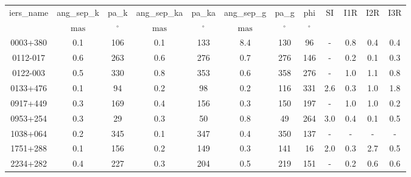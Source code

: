 \begin{table}
\begin{tabular}{cccccccccccc}
iers_name & ang_sep_k & pa_k & ang_sep_ka & pa_ka & ang_sep_g & pa_g & phi & SI & I1R & I2R & I3R \\
 & $\mathrm{mas}$ & $\mathrm{{}^{\circ}}$ & $\mathrm{mas}$ & $\mathrm{{}^{\circ}}$ & $\mathrm{mas}$ & $\mathrm{{}^{\circ}}$ & $\mathrm{{}^{\circ}}$ &  &  &  &  \\
0003+380 & 0.1 & 106 & 0.1 & 133 & 8.4 & 130 & 96 & - & 0.8 & 0.4 & 0.4 \\
0112-017 & 0.6 & 263 & 0.6 & 276 & 0.7 & 276 & 146 & - & 0.2 & 0.1 & 0.3 \\
0122-003 & 0.5 & 330 & 0.8 & 353 & 0.6 & 358 & 276 & - & 1.0 & 1.1 & 0.8 \\
0133+476 & 0.1 & 94 & 0.2 & 98 & 0.2 & 116 & 331 & 2.6 & 0.3 & 1.0 & 1.8 \\
0917+449 & 0.3 & 169 & 0.4 & 156 & 0.3 & 150 & 197 & - & 1.0 & 1.0 & 0.2 \\
0953+254 & 0.3 & 29 & 0.3 & 50 & 0.8 & 49 & 264 & 3.0 & 0.4 & 0.1 & 0.5 \\
1038+064 & 0.2 & 345 & 0.1 & 347 & 0.4 & 350 & 137 & - & - & - & - \\
1751+288 & 0.1 & 156 & 0.2 & 149 & 0.3 & 141 & 16 & 2.0 & 0.3 & 2.7 & 0.5 \\
2234+282 & 0.4 & 227 & 0.3 & 204 & 0.5 & 219 & 151 & - & 0.2 & 0.6 & 0.6 \\
\end{tabular}
\end{table}
